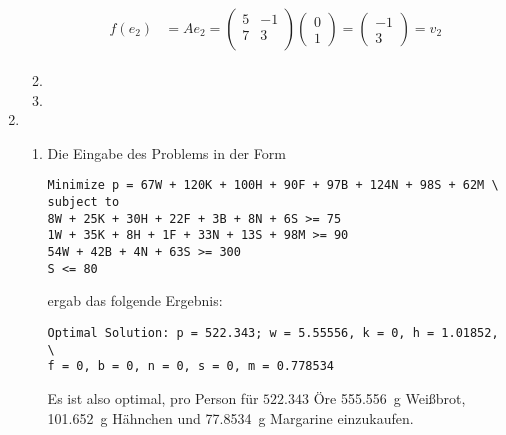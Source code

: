 \documentclass[a4paper]{scrartcl}
\begin{document}
\begin{enumerate}[label=\bfseries\arabic*.]
\begin{enumerate}
\begin{align}
                    \begin{split}
                        f(e_2) &= Ae_2 =
                        \begin{pmatrix}
                            5 & -1 \\
                            7 &  3 \\
                        \end{pmatrix}
                        \begin{pmatrix}
                            0 \\ 1
                        \end{pmatrix}
                        =
                        \begin{pmatrix}
                            -1 \\ 3
                        \end{pmatrix}
                        = v_2
                    \end{split}
                \end{align}
                
                

            \item

            \item

        \end{enumerate}

    \item
        \begin{enumerate}
            \item
                Die Eingabe des Problems in der Form
                \begin{verbatim}
Minimize p = 67W + 120K + 100H + 90F + 97B + 124N + 98S + 62M \
subject to
8W + 25K + 30H + 22F + 3B + 8N + 6S >= 75
1W + 35K + 8H + 1F + 33N + 13S + 98M >= 90
54W + 42B + 4N + 63S >= 300
S <= 80 \end{verbatim}
                ergab das folgende Ergebnis:
                \begin{verbatim}
Optimal Solution: p = 522.343; w = 5.55556, k = 0, h = 1.01852, \
f = 0, b = 0, n = 0, s = 0, m = 0.778534 \end{verbatim}
                Es ist also optimal, pro Person für $522.343$ Öre
                \SI{555,556}{\gram} Weißbrot, \SI{101,652}{\gram} Hähnchen
                und \SI{77,8534}{\gram} Margarine einzukaufen.


\end{enumerate}
\end{enumerate}
\end{document}
